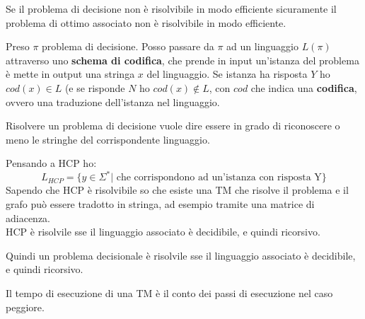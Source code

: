 \documentclass[a4paper,12pt, oneside]{book}
\begin{document}
\begin{teorema}
  Se il problema di decisione non è risolvibile in modo efficiente sicuramente
  il problema di ottimo associato non è risolvibile in modo efficiente.
\end{teorema}
\begin{teorema}
  Preso $\pi$ problema di decisione. Posso passare da $\pi$ ad un linguaggio
  $L(\pi)$ attraverso uno \textbf{schema di codifica}, che prende in input
  un'istanza del problema è mette in output una stringa $x$ del linguaggio. Se
  istanza ha risposta $Y$ ho $cod(x)\in L$ (e se risponde $N$ ho $cod(x)\not\in
  L$, con $cod$ che indica una 
  \textbf{codifica}, ovvero una traduzione dell'istanza nel linguaggio.\\
\end{teorema}
Risolvere un problema di decisione vuole dire essere in grado di riconoscere o
meno le stringhe del corrispondente linguaggio.
\begin{esempio}
  Pensando a HCP ho:
  \[L_{HCP}=\{y\in \Sigma^*|\mbox{ che corrispondono ad un'istanza con risposta
      Y}\}\]
  Sapendo che HCP è risolvibile so che esiste una TM che risolve il problema e
  il grafo può essere tradotto in stringa, ad esempio tramite una matrice di
  adiacenza.\\
  HCP è risolvile sse il linguaggio associato è decidibile, e quindi ricorsivo.
\end{esempio}
\begin{teorema}
  Quindi un problema decisionale è risolvile sse il linguaggio associato è
  decidibile, e quindi ricorsivo.
\end{teorema}
\begin{definizione}
  Il tempo di esecuzione di una TM è il conto dei passi di esecuzione nel caso
  peggiore.
\end{definizione}
\newpage
\end{document}
